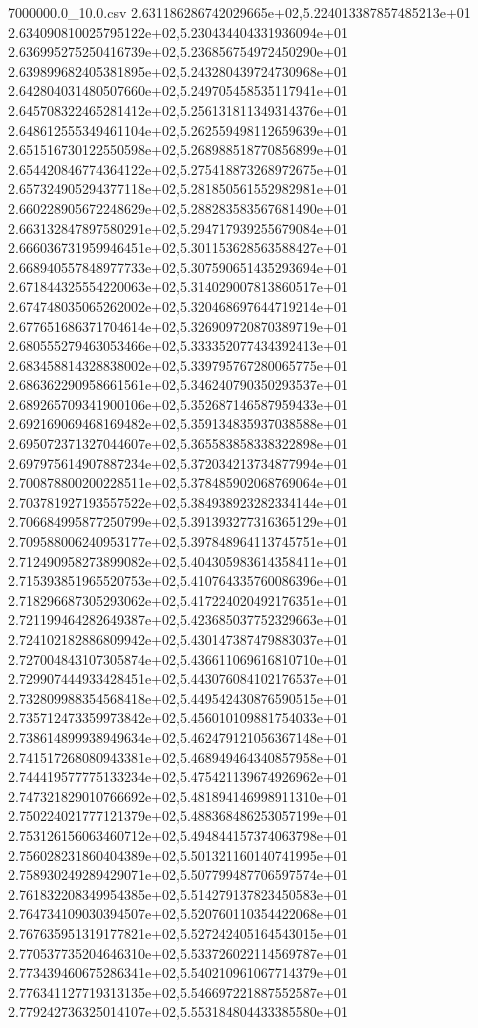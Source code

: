 \begin{filecontents*}{7000000.0_10.0.csv}
2.631186286742029665e+02,5.224013387857485213e+01
2.634090810025795122e+02,5.230434404331936094e+01
2.636995275250416739e+02,5.236856754972450290e+01
2.639899682405381895e+02,5.243280439724730968e+01
2.642804031480507660e+02,5.249705458535117941e+01
2.645708322465281412e+02,5.256131811349314376e+01
2.648612555349461104e+02,5.262559498112659639e+01
2.651516730122550598e+02,5.268988518770856899e+01
2.654420846774364122e+02,5.275418873268972675e+01
2.657324905294377118e+02,5.281850561552982981e+01
2.660228905672248629e+02,5.288283583567681490e+01
2.663132847897580291e+02,5.294717939255679084e+01
2.666036731959946451e+02,5.301153628563588427e+01
2.668940557848977733e+02,5.307590651435293694e+01
2.671844325554220063e+02,5.314029007813860517e+01
2.674748035065262002e+02,5.320468697644719214e+01
2.677651686371704614e+02,5.326909720870389719e+01
2.680555279463053466e+02,5.333352077434392413e+01
2.683458814328838002e+02,5.339795767280065775e+01
2.686362290958661561e+02,5.346240790350293537e+01
2.689265709341900106e+02,5.352687146587959433e+01
2.692169069468169482e+02,5.359134835937038588e+01
2.695072371327044607e+02,5.365583858338322898e+01
2.697975614907887234e+02,5.372034213734877994e+01
2.700878800200228511e+02,5.378485902068769064e+01
2.703781927193557522e+02,5.384938923282334144e+01
2.706684995877250799e+02,5.391393277316365129e+01
2.709588006240953177e+02,5.397848964113745751e+01
2.712490958273899082e+02,5.404305983614358411e+01
2.715393851965520753e+02,5.410764335760086396e+01
2.718296687305293062e+02,5.417224020492176351e+01
2.721199464282649387e+02,5.423685037752329663e+01
2.724102182886809942e+02,5.430147387479883037e+01
2.727004843107305874e+02,5.436611069616810710e+01
2.729907444933428451e+02,5.443076084102176537e+01
2.732809988354568418e+02,5.449542430876590515e+01
2.735712473359973842e+02,5.456010109881754033e+01
2.738614899938949634e+02,5.462479121056367148e+01
2.741517268080943381e+02,5.468949464340857958e+01
2.744419577775133234e+02,5.475421139674926962e+01
2.747321829010766692e+02,5.481894146998911310e+01
2.750224021777121379e+02,5.488368486253057199e+01
2.753126156063460712e+02,5.494844157374063798e+01
2.756028231860404389e+02,5.501321160140741995e+01
2.758930249289429071e+02,5.507799487706597574e+01
2.761832208349954385e+02,5.514279137823450583e+01
2.764734109030394507e+02,5.520760110354422068e+01
2.767635951319177821e+02,5.527242405164543015e+01
2.770537735204646310e+02,5.533726022114569787e+01
2.773439460675286341e+02,5.540210961067714379e+01
2.776341127719313135e+02,5.546697221887552587e+01
2.779242736325014107e+02,5.553184804433385580e+01

\end{filecontents*}
